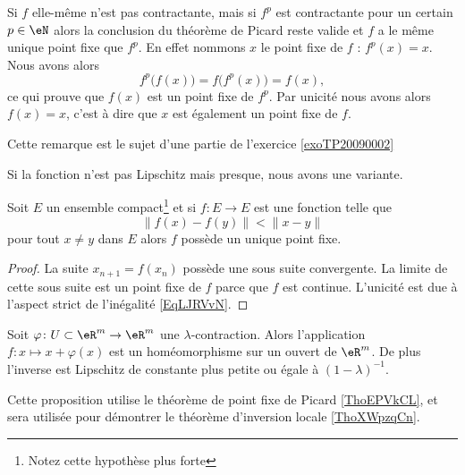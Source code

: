 \begin{remark}  \label{remIOHUJm}
    Si \( f\) elle-même n'est pas contractante, mais si \( f^p\) est contractante pour un certain \( p\in \eN\) alors la conclusion du théorème de Picard reste valide et \( f\) a le même unique point fixe que \( f^p\). En effet nommons \( x\) le point fixe de \( f\) : \( f^p(x)=x\). Nous avons alors
    \begin{equation}
        f^p\big( f(x) \big)=f\big( f^p(x) \big)=f(x),
    \end{equation}
    ce qui prouve que \( f(x)\) est un point fixe de \( f^p\). Par unicité nous avons alors \( f(x)=x\), c'est à dire que \( x\) est également un point fixe de \( f\).

    Cette remarque est le sujet d'une partie de l'exercice \ref{exoTP20090002}
\end{remark}

Si la fonction n'est pas Lipschitz mais presque, nous avons une variante.
\begin{proposition}
    Soit \( E\) un ensemble compact\footnote{Notez cette hypothèse plus forte} et si \( f\colon E\to E\) est une fonction telle que
    \begin{equation}        \label{EqLJRVvN}
        \| f(x)-f(y) \|< \| x-y \|
    \end{equation}
    pour tout \( x\neq y\) dans \( E\) alors \( f\) possède un unique point fixe.
\end{proposition}

\begin{proof}
    La suite \( x_{n+1}=f(x_n)\) possède une sous suite convergente. La limite de cette sous suite est un point fixe de \( f\) parce que \( f\) est continue. L'unicité est due à l'aspect strict de l'inégalité \eqref{EqLJRVvN}.
\end{proof}

\begin{proposition} \label{PropGZoqknC}
    Soit \( \varphi\colon U\subset \eR^m\to \eR^m\) une \( \lambda\)-contraction. Alors l'application \( f\colon x\mapsto x+\varphi(x)\) est un homéomorphisme sur un ouvert de \( \eR^m\). De plus l'inverse est Lipschitz de constante plus petite ou égale à \( (1-\lambda)^{-1}\).
\end{proposition}
Cette proposition utilise le théorème de point fixe de Picard \ref{ThoEPVkCL},
et sera utilisée pour démontrer le théorème d'inversion locale \ref{ThoXWpzqCn}.

